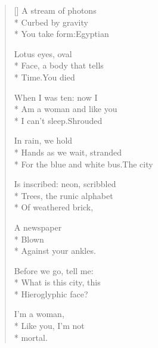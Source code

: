 \begingroup
{}
\label{ch:marilyn_poems}

\settowidth{\versewidth}{For the blue and white bus.\quad The city}
\begin{verse}[\versewidth]
A stream of photons\\*
Curbed by gravity\\*
You take form:\qquad Egyptian

Lotus eyes, oval\\*
Face, a body that tells\\*
Time.\qquad You died

When I was ten:  now I\\*
Am a woman and like you\\*
I can't sleep.\quad Shrouded

In rain, we hold\\*
Hands as we wait, stranded\\*
For the blue and white bus.\quad The city

Is inscribed: neon, scribbled\\*
Trees, the runic alphabet\\*
Of weathered brick,

A newspaper\\*
Blown\\*
Against your ankles.

Before we go, tell me:\\*
What is this city, this\\*
Hieroglyphic face?  

I'm a woman,\\*
Like you, I'm not\\*
mortal.
\end{verse}

\renewcommand{\poemtoc}{subsection}
\clearpage

